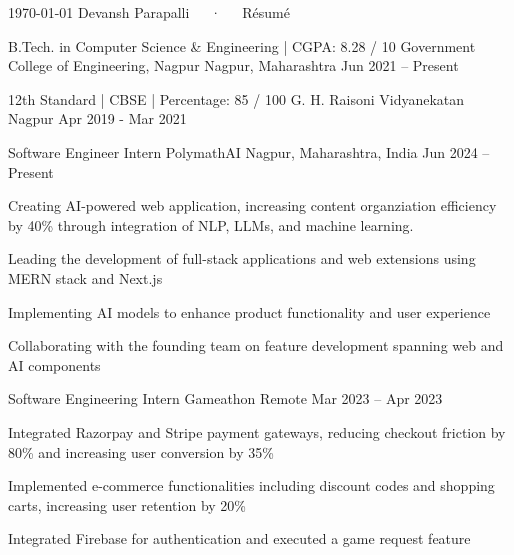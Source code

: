 \documentclass[11pt, a4paper]{awesome-cv}
\begin{document}
\makecvheader

\makecvfooter
  {\today}
  {Devansh Parapalli~~~·~~~Résumé}
  {\thepage}


\begin{cventries}

\cventry
  {B.Tech. in Computer Science \& Engineering | CGPA: 8.28 / 10}
  {Government College of Engineering, Nagpur}
  {Nagpur, Maharashtra}
  {Jun 2021 -- Present}
  {}

\cventry
  {12th Standard | CBSE | Percentage: 85 / 100}
  {G. H. Raisoni Vidyanekatan}
  {Nagpur}
  {Apr 2019 - Mar 2021}
  {}


\end{cventries}


\begin{cventries}

\cventry
  {Software Engineer Intern}
  {PolymathAI}
  {Nagpur, Maharashtra, India}
  {Jun 2024 -- Present}
  {
    \begin{cvitems}
      \item {Creating AI-powered web application, increasing content organziation efficiency by 40\% through integration of NLP, LLMs, and machine learning.}
      \item {Leading the development of full-stack applications and web extensions using MERN stack and Next.js}
      \item {Implementing AI models to enhance product functionality and user experience}
      \item {Collaborating with the founding team on feature development spanning web and AI components}
    \end{cvitems}
  }

  \vskip 0.35cm

\cventry
  {Software Engineering Intern}
  {Gameathon}
  {Remote}
  {Mar 2023 -- Apr 2023}
  {
    \begin{cvitems}
      \item {Integrated Razorpay and Stripe payment gateways, reducing checkout friction by 80\% and increasing user conversion by 35\%}
      \item {Implemented e-commerce functionalities including discount codes and shopping carts, increasing user retention by 20\%}
      \item {Integrated Firebase for authentication and executed a game request feature}
    \end{cvitems}
  }

\end{cventries}
\end{document}
